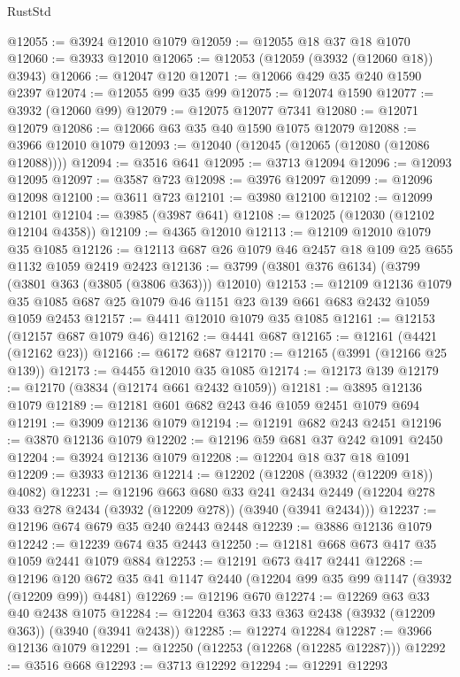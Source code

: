 \begin{lexlean}{RustStd}
\begin{coremodule}
@12055 := @3924 @12010 @1079
@12059 := @12055 @18 @37 @18 @1070
@12060 := @3933 @12010
@12065 := @12053 (@12059 (@3932 (@12060 @18)) @3943)
@12066 := @12047 @120
@12071 := @12066 @429 @35 @240 @1590 @2397
@12074 := @12055 @99 @35 @99
@12075 := @12074 @1590
@12077 := @3932 (@12060 @99)
@12079 := @12075 @12077 @7341
@12080 := @12071 @12079
@12086 := @12066 @63 @35 @40 @1590 @1075 @12079
@12088 := @3966 @12010 @1079
@12093 := @12040 (@12045 (@12065 (@12080 (@12086 @12088))))
@12094 := @3516 @641
@12095 := @3713 @12094
@12096 := @12093 @12095
@12097 := @3587 @723
@12098 := @3976 @12097
@12099 := @12096 @12098
@12100 := @3611 @723
@12101 := @3980 @12100
@12102 := @12099 @12101
@12104 := @3985 (@3987 @641)
@12108 := @12025 (@12030 (@12102 @12104 @4358))
@12109 := @4365 @12010
@12113 := @12109 @12010 @1079 @35 @1085
@12126 := @12113 @687 @26 @1079 @46 @2457 @18 @109 @25 @655 @1132 @1059 @2419 @2423
@12136 := @3799 (@3801 @376 @6134) (@3799 (@3801 @363 (@3805 (@3806 @363))) @12010)
@12153 := @12109
    @12136
    @1079
    @35
    @1085
    @687
    @25
    @1079
    @46
    @1151
    @23
    @139
    @661
    @683
    @2432
    @1059
    @1059
    @2453
@12157 := @4411 @12010 @1079 @35 @1085
@12161 := @12153 (@12157 @687 @1079 @46)
@12162 := @4441 @687
@12165 := @12161 (@4421 (@12162 @23))
@12166 := @6172 @687
@12170 := @12165 (@3991 (@12166 @25 @139))
@12173 := @4455 @12010 @35 @1085
@12174 := @12173 @139
@12179 := @12170 (@3834 (@12174 @661 @2432 @1059))
@12181 := @3895 @12136 @1079
@12189 := @12181 @601 @682 @243 @46 @1059 @2451 @1079 @694
@12191 := @3909 @12136 @1079
@12194 := @12191 @682 @243 @2451
@12196 := @3870 @12136 @1079
@12202 := @12196 @59 @681 @37 @242 @1091 @2450
@12204 := @3924 @12136 @1079
@12208 := @12204 @18 @37 @18 @1091
@12209 := @3933 @12136
@12214 := @12202 (@12208 (@3932 (@12209 @18)) @4082)
@12231 := @12196
    @663
    @680
    @33
    @241
    @2434
    @2449
    (@12204 @278 @33 @278 @2434 (@3932 (@12209 @278)) (@3940 (@3941 @2434)))
@12237 := @12196 @674 @679 @35 @240 @2443 @2448
@12239 := @3886 @12136 @1079
@12242 := @12239 @674 @35 @2443
@12250 := @12181 @668 @673 @417 @35 @1059 @2441 @1079 @884
@12253 := @12191 @673 @417 @2441
@12268 := @12196 @120 @672 @35 @41 @1147 @2440 (@12204 @99 @35 @99 @1147 (@3932 (@12209 @99)) @4481)
@12269 := @12196 @670
@12274 := @12269 @63 @33 @40 @2438 @1075
@12284 := @12204 @363 @33 @363 @2438 (@3932 (@12209 @363)) (@3940 (@3941 @2438))
@12285 := @12274 @12284
@12287 := @3966 @12136 @1079
@12291 := @12250 (@12253 (@12268 (@12285 @12287)))
@12292 := @3516 @668
@12293 := @3713 @12292
@12294 := @12291 @12293

\end{coremodule}
\end{lexlean}
